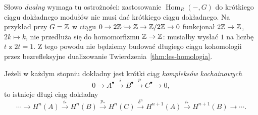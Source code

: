 Słowo \emph{dualny} wymaga tu ostrożności:
zastosowanie $\operatorname{Hom}_R(-,G)$
do krótkiego ciągu dokładnego modułów
nie musi dać krótkiego ciągu dokładnego.
Na przykład przy $G=\mathbb{Z}$ w ciągu
$0\to2\mathbb{Z}\hookrightarrow\mathbb{Z}\to\mathbb{Z}/2\mathbb{Z}\to0$
funkcjonał $2\mathbb{Z}\to\mathbb{Z}$, $2k\mapsto k$,
nie przedłuża się do homomorfizmu
$\mathbb{Z}\to\mathbb{Z}$: musiałby wysłać $1$
na liczbę $t$ z $2t=1$.
Z tego powodu nie będziemy budować
długiego ciągu kohomologii przez
bezrefleksyjne dualizowanie
Twierdzenia~\ref{thm:les-homologia}.

\begin{twierdzenie}
\label{thm:les-kohomologia}
Jeżeli w każdym stopniu dokładny jest
krótki ciąg \emph{kompleksów kochainowych}
\[
 0\longrightarrow A^\bullet\xrightarrow{i}B^\bullet
 \xrightarrow{p}C^\bullet\longrightarrow0,
\]
to istnieje długi ciąg dokładny
\begin{equation}\label{eq:les-kohomologia}
 \cdots\longrightarrow H^n(A)
 \xrightarrow{i_*}H^n(B)
 \xrightarrow{p_*}H^n(C)
 \xrightarrow{\delta^n}H^{n+1}(A)
 \xrightarrow{i_*}H^{n+1}(B)\longrightarrow\cdots.
\end{equation}
\end{twierdzenie}
